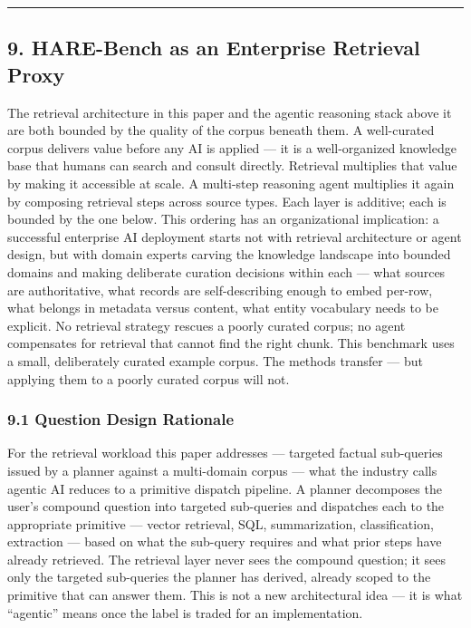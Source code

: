 \begin{center}\rule{0.5\linewidth}{0.5pt}\end{center}

\subsection{9. HARE-Bench as an Enterprise Retrieval Proxy}\label{hare-bench-as-an-enterprise-retrieval-proxy}

The retrieval architecture in this paper and the agentic reasoning stack above it are both bounded by the quality of the corpus beneath them. A well-curated corpus delivers value before any AI is applied --- it is a well-organized knowledge base that humans can search and consult directly. Retrieval multiplies that value by making it accessible at scale. A multi-step reasoning agent multiplies it again by composing retrieval steps across source types. Each layer is additive; each is bounded by the one below. This ordering has an organizational implication: a successful enterprise AI deployment starts not with retrieval architecture or agent design, but with domain experts carving the knowledge landscape into bounded domains and making deliberate curation decisions within each --- what sources are authoritative, what records are self-describing enough to embed per-row, what belongs in metadata versus content, what entity vocabulary needs to be explicit. No retrieval strategy rescues a poorly curated corpus; no agent compensates for retrieval that cannot find the right chunk. This benchmark uses a small, deliberately curated example corpus. The methods transfer --- but applying them to a poorly curated corpus will not.

\subsubsection{9.1 Question Design Rationale}\label{question-design-rationale}

For the retrieval workload this paper addresses --- targeted factual sub-queries issued by a planner against a multi-domain corpus --- what the industry calls agentic AI reduces to a primitive dispatch pipeline. A planner decomposes the user's compound question into targeted sub-queries and dispatches each to the appropriate primitive --- vector retrieval, SQL, summarization, classification, extraction --- based on what the sub-query requires and what prior steps have already retrieved. The retrieval layer never sees the compound question; it sees only the targeted sub-queries the planner has derived, already scoped to the primitive that can answer them. This is not a new architectural idea --- it is what ``agentic'' means once the label is traded for an implementation.

